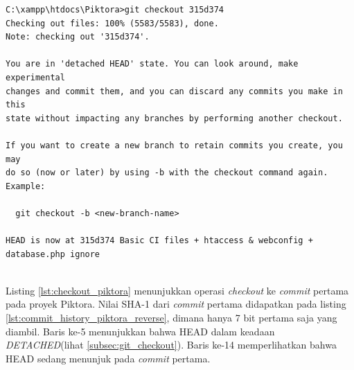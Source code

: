 \begin{lstlisting}[caption={Git Checkout ke \textit{commit} pertama pada proyek Piktora},label={lst:checkout_piktora},language=plaintext]
C:\xampp\htdocs\Piktora>git checkout 315d374
Checking out files: 100% (5583/5583), done.
Note: checking out '315d374'.

You are in 'detached HEAD' state. You can look around, make experimental
changes and commit them, and you can discard any commits you make in this
state without impacting any branches by performing another checkout.

If you want to create a new branch to retain commits you create, you may
do so (now or later) by using -b with the checkout command again. Example:

  git checkout -b <new-branch-name>

HEAD is now at 315d374 Basic CI files + htaccess & webconfig + database.php ignore    
\end{lstlisting}
\ \\   
Listing \ref{lst:checkout_piktora} menunjukkan operasi \textit{checkout} ke \textit{commit} pertama pada proyek Piktora.  Nilai SHA-1 dari \textit{commit} pertama didapatkan pada listing \ref{lst:commit_history_piktora_reverse}, dimana hanya 7 bit pertama saja yang diambil. Baris ke-5 menunjukkan bahwa HEAD dalam keadaan \textit{DETACHED}(lihat \ref{subsec:git_checkout}). Baris ke-14 memperlihatkan bahwa HEAD sedang menunjuk pada \textit{commit} pertama.

